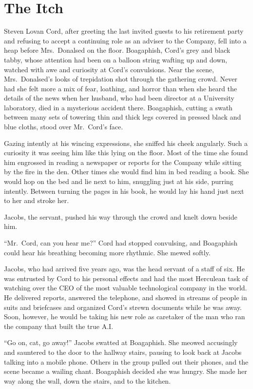 \chapter{The Itch}\label{the-itch}

Steven Lovan Cord, after greeting the last invited guests to his
retirement party and refusing to accept a continuing role as an adviser
to the Company, fell into a heap before Mrs.~Donalsed on the floor.
Boagaphish, Cord's grey and black tabby, whose attention had been on a
balloon string wafting up and down, watched with awe and curiosity at
Cord's convulsions. Near the scene, Mrs.~Donalsed's looks of trepidation
shot through the gathering crowd. Never had she felt more a mix of fear,
loathing, and horror than when she heard the details of the news when
her husband, who had been director at a University laboratory, died in a
mysterious accident there. Boagaphish, cutting a swath between many sets
of towering thin and thick legs covered in pressed black and blue
cloths, stood over Mr.~Cord's face.

Gazing intently at his wincing expressions, she sniffed his cheek
angularly. Such a curiosity it was seeing him like this lying on the
floor. Most of the time she found him engrossed in reading a newspaper
or reports for the Company while sitting by the fire in the den. Other
times she would find him in bed reading a book. She would hop on the bed
and lie next to him, snuggling just at his side, purring intently.
Between turning the pages in his book, he would lay his hand just next
to her and stroke her.

Jacobs, the servant, pushed his way through the crowd and knelt down
beside him.

``Mr.~Cord, can you hear me?'' Cord had stopped convulsing, and
Boagaphish could hear his breathing becoming more rhythmic. She mewed
softly.

Jacobs, who had arrived five years ago, was the head servant of a staff
of six. He was entrusted by Cord to his personal effects and had the
most Herculean task of watching over the CEO of the most valuable
technological company in the world. He delivered reports, answered the
telephone, and showed in streams of people in suits and briefcases and
organized Cord's strewn documents while he was away. Soon, however, he
would be taking his new role as caretaker of the man who ran the company
that built the true A.I.

``Go on, cat, go away!'' Jacobs swatted at Boagaphish. She meowed
accusingly and sauntered to the door to the hallway stairs, pausing to
look back at Jacobs talking into a mobile phone. Others in the group
pulled out their phones, and the scene became a wailing chant.
Boagaphish decided she was hungry. She made her way along the wall, down
the stairs, and to the kitchen.

